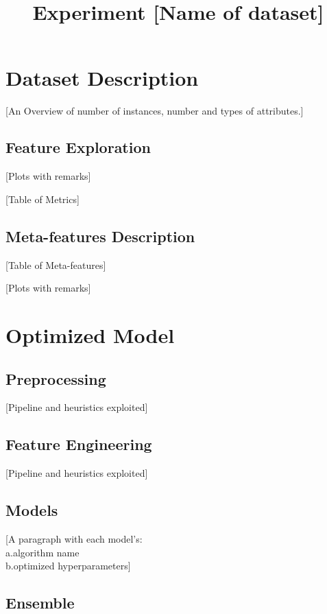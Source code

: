 \documentclass[]{article}
\title{
	\usefont{OT1}{bch}{b}{n}
	\normalfont \normalsize \textsc{} \\ 
	\huge Experiment [Name of dataset] \\[0.5cm]
}
\date{}
\numberwithin{equation}{section}		%
\numberwithin{figure}{section}			%
\numberwithin{table}{section}				%
\begin{document}
	\maketitle
	\section{Dataset Description}
	
	[An Overview of number of instances, number and types of attributes.]
	
	
	\subsection{Feature Exploration}
	
	[Plots with remarks]
	
	[Table of Metrics]
	
	\subsection{Meta-features Description}
	
	[Table of Meta-features]
	
	[Plots with remarks]
	
	
	\section{Optimized Model}
	\subsection{Preprocessing}
	
	[Pipeline and heuristics exploited]
	
	\subsection{Feature Engineering}
	
	[Pipeline and heuristics exploited]
	
	
	\subsection{Models}
	
	[A paragraph with each model's:\\
	 a.algorithm name\\
	 b.optimized hyperparameters]
	
	
	\subsection{Ensemble}
	
\end{document}
